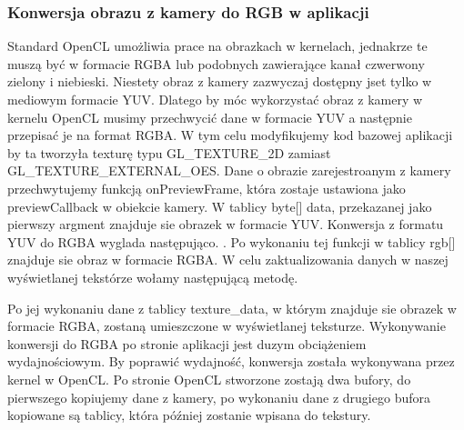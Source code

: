 \subsubsection[Konwersja obrazu z kamery do RGB w aplikacji]{Konwersja obrazu z kamery do RGB w aplikacji}
Standard OpenCL umożliwia prace na obrazkach w kernelach, jednakrze te muszą być w formacie RGBA lub podobnych zawierające kanał czwerwony zielony i niebieski. Niestety obraz z kamery zazwyczaj dostępny jset tylko w mediowym formacie YUV. Dlatego by móc wykorzystać obraz z kamery w kernelu OpenCL musimy przechwycić dane w formacie YUV a następnie przepisać je na format RGBA. W tym celu modyfikujemy kod bazowej aplikacji by ta tworzyła texturę typu GL\_TEXTURE\_2D zamiast GL\_TEXTURE\_EXTERNAL\_OES. Dane o obrazie zarejestroanym z kamery przechwytujemy funkcją onPreviewFrame, która zostaje ustawiona jako previewCallback w obiekcie kamery. W tablicy byte[] data, przekazanej jako pierwszy argment znajduje sie obrazek w formacie YUV. Konwersja z formatu YUV do RGBA wyglada następująco.
. Po wykonaniu tej funkcji w tablicy rgb[] znajduje sie obraz w formacie RGBA. W celu zaktualizowania danych w naszej wyświetlanej tekstórze wołamy następującą metodę. 

Po jej wykonaniu dane z tablicy texture\_data, w którym znajduje sie obrazek w formacie RGBA, zostaną umieszczone w wyświetlanej teksturze.
Wykonywanie konwersji do RGBA po stronie aplikacji jest duzym obciążeniem wydajnościowym. By poprawić wydajność, konwersja została wykonywana przez kernel w OpenCL. Po stronie OpenCL stworzone zostają dwa bufory, do pierwszego kopiujemy dane z kamery, po wykonaniu dane z drugiego bufora kopiowane są tablicy, która później zostanie wpisana do tekstury.

